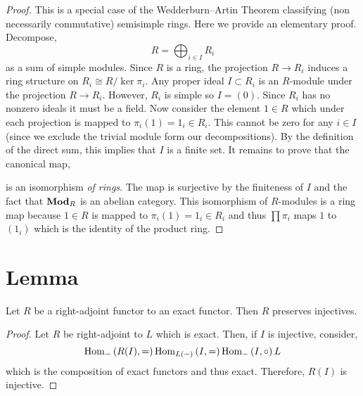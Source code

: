 \documentclass[12pt]{article}
\begin{document}
\begin{proof}
This is a special case of the Wedderburn–Artin Theorem classifying (non necessarily commutative) semisimple rings. Here we provide an elementary proof. Decompose,
\[ R = \bigoplus_{i \in I} R_i \]
as a sum of simple modules. Since $R$ is a ring, the projection $R \to R_i$ induces a ring structure on $R_i \cong R / \ker{\pi_i}$. Any proper ideal $I \subset R_i$ is an $R$-module under the projection $R \to R_i$. However, $R_i$ is simple so $I = (0)$. Since $R_i$ has no nonzero ideals it must be a field. Now consider the element $1 \in R$ which under each projection is mapped to $\pi_i(1) = 1_i \in R_i$. This cannot be zero for any $i \in I$ (since we exclude the trivial module form our decompositions). By the definition of the direct sum, this implies that $I$ is a finite set. It remains to prove that the canonical map,
\begin{center}
\end{center} 
is an isomorphism \textit{of rings}. The map is surjective by the finiteness of $I$ and the fact that $\mathbf{Mod}_{R}$ is an abelian category. This isomorphism of $R$-modules is a ring map because $1 \in R$ is mapped to $\pi_i(1) = 1_i \in R_i$ and thus $\prod \pi_i$ maps $1$ to $(1_i)$ which is the identity of the product ring.  
\end{proof}

\section{Lemma}

\begin{lemma} \label{right_adjoint_to_exact_preserves_injectives}
Let $R$ be a right-adjoint functor to an exact functor. Then $R$ preserves injectives.
\end{lemma}

\begin{proof}
Let $R$ be right-adjoint to $L$ which is exact. Then, if $I$ is injective, consider,
\[ \mathrm{Hom}_{-}\left( R(I) , = \right) \mathrm{Hom}_{L(-)}\left( I , = \right) \mathrm{Hom}_{-}\left( I , \circ \right) L \]
which is the composition of exact functors and thus exact. Therefore, $R(I)$ is injective.
\end{proof}
\end{document}
